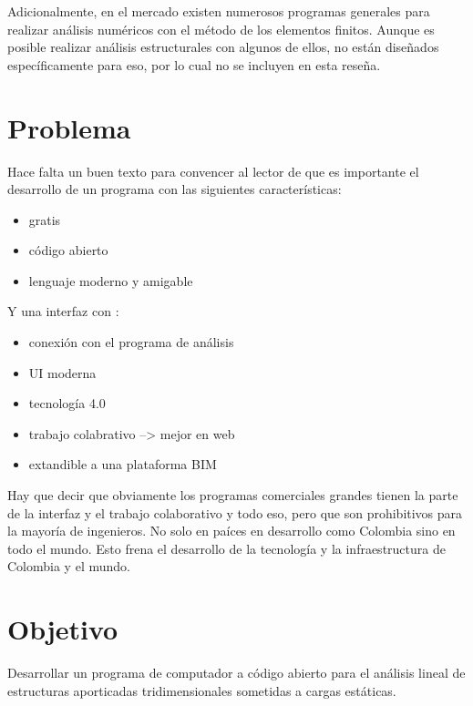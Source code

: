 Adicionalmente, en el mercado existen numerosos programas generales para realizar análisis numéricos con el método de los elementos finitos. Aunque es posible realizar análisis estructurales con algunos de ellos, no están diseñados específicamente para eso, por lo cual no se incluyen en esta reseña.

\section{Problema} %

\begin{nota}
  \tcblower
  Hace falta un buen texto para convencer al lector de que es importante el desarrollo de un programa con las siguientes características:

  \begin{itemize}
    \item gratis
    \item código abierto
    \item lenguaje moderno y amigable 
  \end{itemize}

  Y una interfaz con :

  \begin{itemize}
    \item conexión con el programa de análisis
    \item UI moderna
    \item tecnología 4.0 
    \item trabajo colabrativo --> mejor en web
    \item extandible a una plataforma BIM 
  \end{itemize}

  Hay que decir que obviamente los programas comerciales grandes tienen la parte de la interfaz y el trabajo colaborativo y todo eso, pero que son prohibitivos para la mayoría de ingenieros. No solo en paíces en desarrollo como Colombia sino en todo el mundo. Esto frena el desarrollo de la tecnología y la infraestructura de Colombia y el mundo.
\end{nota}

\section{Objetivo}

Desarrollar un programa de computador a código abierto para el análisis lineal de estructuras aporticadas tridimensionales sometidas a cargas estáticas.\\

